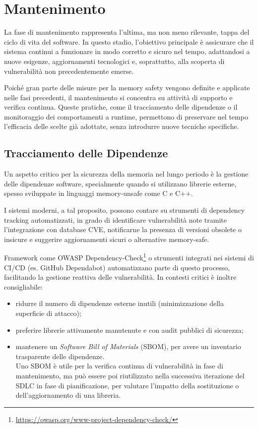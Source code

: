 \section{Mantenimento}
\label{sec:maintenance}

La fase di mantenimento rappresenta l'ultima, ma non meno rilevante, tappa del ciclo
di vita del software. In questo stadio, l'obiettivo principale è assicurare che il
sistema continui a funzionare in modo corretto e sicuro nel tempo, adattandosi a
nuove esigenze, aggiornamenti tecnologici e, soprattutto, alla scoperta di vulnerabilità
non precedentemente emerse.

Poiché gran parte delle misure per la memory safety vengono definite e applicate
nelle fasi precedenti, il mantenimento si concentra su attività di supporto e
verifica continua. Queste pratiche, come il tracciamento delle dipendenze o il
monitoraggio dei comportamenti a runtime, permettono di preservare nel tempo l'efficacia
delle scelte già adottate, senza introdurre nuove tecniche specifiche.

\subsection{Tracciamento delle Dipendenze}
\label{sec:tracciamento-dipendenze}

Un aspetto critico per la sicurezza della memoria nel lungo periodo è la gestione
delle dipendenze software, specialmente quando si utilizzano librerie esterne, spesso
sviluppate in linguaggi memory-unsafe come C e C++.

I sistemi moderni, a tal proposito, possono contare su strumenti di dependency tracking
automatizzati, in grado di identificare vulnerabilità note tramite l'integrazione
con database CVE, notificarne la presenza di versioni obsolete o insicure e suggerire
aggiornamenti sicuri o alternative memory-safe.

Framework come OWASP Dependency-Check\footnote{\url{https://owasp.org/www-project-dependency-check/}}
o strumenti integrati nei sistemi di CI/CD (es. GitHub Dependabot) automatizzano
parte di questo processo, facilitando la gestione reattiva delle vulnerabilità. In
contesti critici è inoltre consigliabile:
\begin{itemize}
  \item ridurre il numero di dipendenze esterne inutili (minimizzazione della
    superficie di attacco);

  \item preferire librerie attivamente manutenute e con audit pubblici di sicurezza;

  \item mantenere un \textit{Software Bill of Materials} (SBOM), per avere un inventario
    trasparente delle dipendenze. \\ Uno SBOM è utile per la verifica continua
    di vulnerabilità in fase di mantenimento, ma può essere poi riutilizzato nella
    successiva iterazione del SDLC in fase di pianificazione, per valutare l'impatto
    della sostituzione o dell'aggiornamento di una libreria.
\end{itemize}

